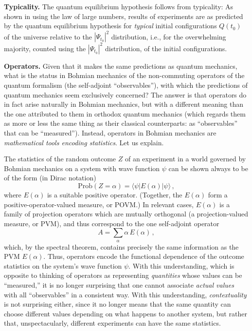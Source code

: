 \documentclass[12pt]{report}
\newcommand{\scp}[2]{\langle #1|#2 \rangle}
\newcommand{\see}{}%
\begin{document}
\bigskip

\noindent\textbf{Typicality. } The quantum equilibrium hypothesis follows from typicality: As shown in \cite{DGZ92} using the law of large numbers, results of experiments are as predicted by the quantum equilibrium hypothesis for \emph{typical} initial configurations $Q(t_0)$ of the universe relative to the $|\Psi_{t_0}|^2$ distribution, i.e., for the overwhelming majority, counted using the $|\Psi_{t_0}|^2$ distribution, of the initial configurations.

\bigskip

\noindent\textbf{Operators. } Given that it makes the same predictions as quantum mechanics, what is the status in Bohmian mechanics of the non-commuting operators of the quantum formalism (the self-adjoint ``observables''), with which the predictions of quantum mechanics seem exclusively concerned? The answer is that operators do in fact arise naturally in Bohmian mechanics, but with a different meaning than the one attributed to them in orthodox quantum mechanics (which regards them as more or less the same thing as their classical counterparts: as ``observables'' that can be ``measured''). Instead, operators in Bohmian mechanics are \emph{mathematical tools encoding statistics}. Let us explain.

The statistics of the random outcome $Z$ of an experiment in a world governed by Bohmian mechanics on a system with wave function $\psi$ can be shown \cite{DGZ04} always to be of the form (in \see Dirac notation)
\begin{equation}
\text{Prob}(Z=\alpha) = \scp{\psi}{E(\alpha)|\psi}\,,
\end{equation}
where $E(\alpha)$ is a suitable positive operator. (Together, the $E(\alpha)$ form a positive-operator-valued measure, or \see POVM.) In relevant cases, $E(\alpha)$ is a family of \see projection operators which are mutually orthogonal (a projection-valued measure, or PVM), and thus correspond to the one self-adjoint operator
\begin{equation}\label{AE}
A = \sum_\alpha \alpha \, E(\alpha)\,,
\end{equation}
which, by the spectral theorem, contains precisely the same information as the PVM $E(\alpha)$.
Thus, operators encode the functional dependence of the outcome statistics on the system's wave function $\psi$. With this understanding, which is opposite to thinking of operators as representing \emph{quantities} whose values can be ``measured,'' it is no longer surprising that one cannot associate \emph{actual values} with all ``observables'' in a consistent way. With this understanding, \emph{contextuality} is not surprising either, since it no longer means that the same quantity can choose different values depending on what happens to another system, but rather that, unspectacularly, different experiments can have the same statistics.
\end{document}
